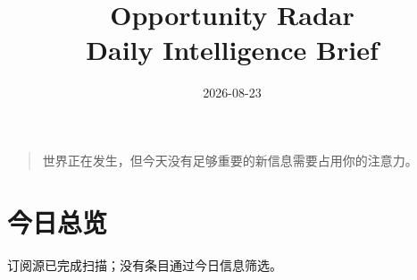 \documentclass[11pt]{ctexart}
\title{Opportunity Radar\\Daily Intelligence Brief}
\date{2026-08-23}
\begin{document}
\maketitle
\begin{quote}\Large 世界正在发生，但今天没有足够重要的新信息需要占用你的注意力。\end{quote}
\section*{今日总览}
订阅源已完成扫描；没有条目通过今日信息筛选。
\end{document}
